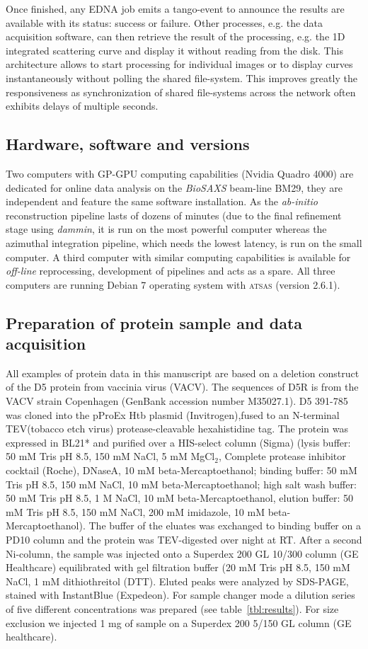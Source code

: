 \documentclass[preprint,pdf]{iucr}              %
\begin{document}
Once finished, any EDNA job emits a tango-event to announce the results are
available with its status: success or failure.
Other processes, e.g. the data acquisition software, can then retrieve the result
of the processing, e.g. the 1D integrated scattering curve and
display it without reading from the disk.
This architecture allows to start processing for individual images or to
display curves instantaneously without polling the shared file-system.
This improves greatly the responsiveness as synchronization of shared
file-systems across the network often exhibits delays of multiple seconds.

\subsection{Hardware, software and versions}
Two computers with GP-GPU computing capabilities (Nvidia Quadro 4000) are
dedicated for online data analysis on the \textit{BioSAXS} beam-line BM29, they are
independent and feature the same software installation.
As the \textit{ab-initio} reconstruction pipeline lasts of dozens of minutes
(due to the final refinement stage using \textit{dammin}, it is run on the most
powerful computer whereas the azimuthal integration pipeline, which needs the lowest
latency, is run on the small computer.
A third computer with similar computing capabilities is available for
\textit{off-line} reprocessing, development of pipelines and acts as a spare.
All three computers are running Debian 7 operating system with \textsc{atsas}
(version 2.6.1).


\subsection{Preparation of protein sample and data acquisition}
All examples of protein data in this manuscript are based on a deletion construct of 
the D5 protein from vaccinia virus (VACV).
The sequences of D5R is from the VACV strain Copenhagen (GenBank accession number M35027.1). 
D5 391-785 was cloned into the pProEx Htb plasmid (Invitrogen),fused to an N-terminal 
TEV(tobacco etch virus) protease-cleavable hexahistidine tag. The protein was expressed in 
BL21* and purified over a HIS-select column (Sigma) (lysis buffer: 50 mM Tris pH 8.5, 150 mM NaCl, 
5 mM MgCl$_{2}$, Complete protease inhibitor cocktail (Roche), DNaseA, 10 mM beta-Mercaptoethanol; binding buffer: 50 mM Tris pH 8.5, 150 mM NaCl, 10 mM beta-Mercaptoethanol; high salt wash buffer: 50 mM Tris pH 8.5, 1 M NaCl, 10 mM beta-Mercaptoethanol, elution buffer: 50 mM Tris pH 8.5, 150 mM NaCl,  200 mM imidazole, 10 mM beta-Mercaptoethanol). The buffer of the eluates was exchanged to binding buffer on a PD10 column and the protein was TEV-digested over night at RT. After a second Ni-column, the sample was injected onto a Superdex 200 GL 10/300 column (GE Healthcare) equilibrated with gel filtration buffer (20 mM Tris pH 8.5, 150 mM NaCl, 1 mM dithiothreitol (DTT). Eluted peaks were analyzed by SDS-PAGE, stained with InstantBlue (Expedeon).  
For sample changer mode a dilution series of five different concentrations was prepared 
(see table~\ref{tbl:results}). For size exclusion we injected 1 mg of sample on a Superdex 
200 5/150 GL column (GE healthcare).
\end{document}
